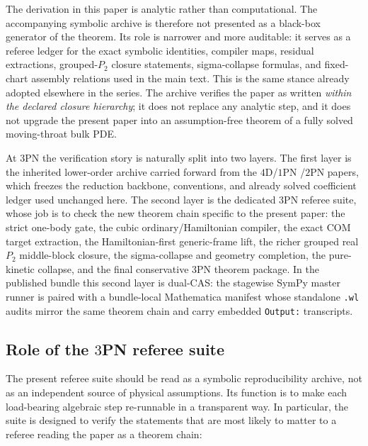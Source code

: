 \documentclass[11pt]{article}
\begin{document}
The derivation in this paper is analytic rather than computational.  The
accompanying symbolic archive is therefore not presented as a black-box
generator of the theorem.  Its role is narrower and more auditable: it serves
as a referee ledger for the exact symbolic identities, compiler maps, residual
extractions, grouped-$P_2$ closure statements, sigma-collapse formulas, and
fixed-chart assembly relations used in the main text.  This is the same stance
already adopted elsewhere in the series.  The archive verifies the paper as
written \emph{within the declared closure hierarchy}; it does not replace any
analytic step, and it does not upgrade the present paper into an
assumption-free theorem of a fully solved moving-throat bulk PDE.

At $3$PN the verification story is naturally split into two layers.  The first
layer is the inherited lower-order archive carried forward from the $4$D/$1$PN
/$2$PN papers, which freezes the reduction backbone, conventions, and already
solved coefficient ledger used unchanged here.  The second layer is the
dedicated $3$PN referee suite, whose job is to check the new theorem chain
specific to the present paper: the strict one-body gate, the cubic
ordinary/Hamiltonian compiler, the exact COM target extraction, the
Hamiltonian-first generic-frame lift, the richer grouped real $P_2$ middle-block
closure, the sigma-collapse and geometry completion, the pure-kinetic collapse,
and the final conservative $3$PN theorem package.  In the published bundle this
second layer is dual-CAS: the stagewise SymPy master runner is paired with a
bundle-local Mathematica manifest whose standalone \texttt{.wl} audits mirror
the same theorem chain and carry embedded \texttt{Output:} transcripts.

\subsection{Role of the \texorpdfstring{$3$}{3}PN referee suite}
\label{sec:verification-role}

The present referee suite should be read as a symbolic reproducibility archive,
not as an independent source of physical assumptions.  Its function is to make
each load-bearing algebraic step re-runnable in a transparent way.  In
particular, the suite is designed to verify the statements that are most likely
to matter to a referee reading the paper as a theorem chain:
\end{document}
